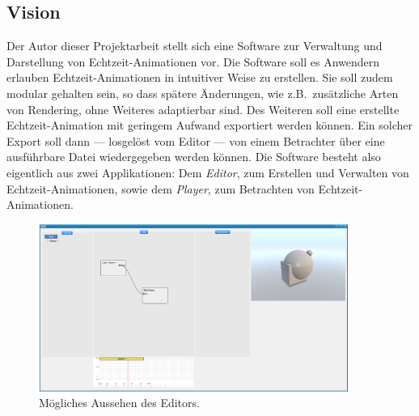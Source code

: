 
\subsection{Vision}
\label{subsec:requirements:vision}

Der Autor dieser Projektarbeit stellt sich eine Software zur Verwaltung und
Darstellung von Echtzeit-Animationen vor. Die Software soll es Anwendern
erlauben Echtzeit-Animationen in intuitiver Weise zu erstellen. Sie soll zudem
modular gehalten sein, so dass spätere Änderungen, wie z.B.\ zusätzliche Arten
von Rendering, ohne Weiteres adaptierbar sind. Des Weiteren soll eine erstellte
Echtzeit-Animation mit geringem Aufwand exportiert werden können. Ein solcher
Export soll dann --- losgelöst vom Editor --- von einem Betrachter über eine
ausführbare Datei wiedergegeben werden können. Die Software besteht also
eigentlich aus zwei Applikationen: Dem \textit{Editor}, zum Erstellen und
Verwalten von Echtzeit-Animationen, sowie dem \textit{Player}, zum Betrachten
von Echtzeit-Animationen.

\begin{figure}[H]
    \centering
    \includegraphics[width=0.9\textwidth]{img/editor_main.png}
    \caption{Mögliches Aussehen des Editors.
        \protect\footnotemark}\label{fig:requirements:vision:editor-main}
\end{figure}

